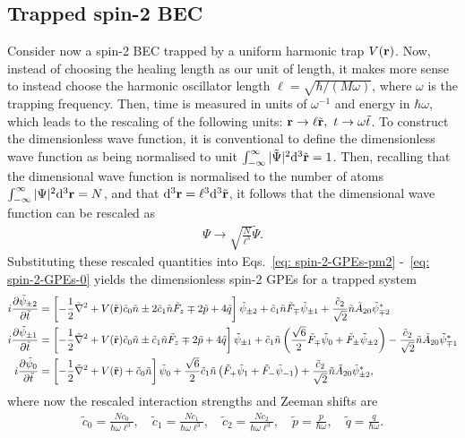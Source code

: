 \subsection{Trapped spin-2 BEC}\label{subsec: spin-2-dimensionless}
Consider now a spin-2 BEC trapped by a uniform harmonic trap \(V(\vb{r})\).
Now, instead of choosing the healing length as our unit of length, it makes more
sense to instead choose the harmonic oscillator length \(\ell =
\sqrt{\hbar/(M\omega)}\), where \(\omega \) is the trapping frequency.
Then, time is measured in units of \(\omega^{-1}\) and energy in
\(\hbar\omega \), which leads to the rescaling of the following units:
\(\vb{r}\rightarrow \ell\tilde{\vb{r}},\ t \rightarrow \omega\tilde{t}\).
To construct the dimensionless wave function, it is conventional to define the
dimensionless wave function as being normalised to unit
\(\int_{-\infty}^\infty |\tilde{\Psi}|^2\dd^3\tilde{\vb{r}} = 1\).
Then, recalling that the dimensional wave function is normalised to the number
of atoms \(\int_{-\infty}^\infty |{\Psi}|^2\dd^3{\vb{r}} = N\), and that
\(\dd^3\vb{r} = \ell^3\dd^3\tilde{\vb{r}}\), it follows that the dimensional
wave function can be rescaled as
\begin{align}
    \Psi \rightarrow \sqrt{\frac{N}{\ell^3}}\tilde{\Psi}.
\end{align}
Substituting these rescaled quantities into Eqs.~\eqref{eq: spin-2-GPEs-pm2}
-~\eqref{eq: spin-2-GPEs-0} yields the dimensionless spin-2 GPEs for a trapped
system
\begin{align}
    i\pdv{\tilde{\psi}_{\pm 2}}{\tilde{t}} &= \left[-\frac{1}{2}\tilde{\nabla}^2
    +V(\tilde{\vb{r}}) \tilde{c}_0\tilde{n} \pm 2\tilde{c}_1\tilde{n}\tilde{F}_z
    \mp 2\tilde{p} + 4\tilde{q}\right]\tilde{\psi}_{\pm 2}
    + \tilde{c}_1\tilde{n}\tilde{F}_\mp\tilde{\psi}_{\pm 1}
    + \frac{\tilde{c}_2}{\sqrt{2}}\tilde{n}\tilde{A}_{20}\tilde{\psi}_{\mp 2}^*
    \\
    i\pdv{\tilde{\psi}_{\pm 1}}{\tilde{t}} &= \left[-\frac{1}{2}\tilde{\nabla}^2
    +V(\tilde{\vb{r}}) \tilde{c}_0\tilde{n} \pm \tilde{c}_1\tilde{n}\tilde{F}_z
    \mp 2\tilde{p} + 4\tilde{q}\right]\tilde{\psi}_{\pm 1}
    +\tilde{c}_1\tilde{n}\left(\frac{\sqrt{6}}{2}\tilde{F}_\mp \tilde{\psi}_0
    +\tilde{F}_\pm\tilde{\psi}_{\pm 2}\right)
    - \frac{\tilde{c}_2}{\sqrt{2}}\tilde{n}\tilde{A}_{20}\tilde{\psi}_{\mp 1}^*
    \\
    i\pdv{\tilde{\psi}_0}{\tilde{t}} &= \left[-\frac{1}{2}\tilde{\nabla}^2
    +V(\tilde{\vb{r}})+\tilde{c}_0\tilde{n}\right]\tilde{\psi}_0
    +\frac{\sqrt{6}}{2}\tilde{c}_1\tilde{n}\left(\tilde{F}_+\tilde{\psi}_1
    +\tilde{F}_-\tilde{\psi}_{-1}\right)
    + \frac{\tilde{c}_2}{\sqrt{2}}\tilde{n}\tilde{A}_{20}\tilde{\psi}_{\pm 2}^*,
\end{align}
where now the rescaled interaction strengths and Zeeman shifts are
\begin{align}\label{eq: spin-2-interaction-strengths-dimensionless}
    \tilde{c}_0 = \frac{Nc_0}{\hbar\omega\ell^3}, \quad
    \tilde{c}_1 = \frac{Nc_1}{\hbar\omega\ell^3}, \quad
    \tilde{c}_2 = \frac{Nc_2}{\hbar\omega\ell^3}, \quad
    \tilde{p} = \frac{p}{\hbar\omega}, \quad
    \tilde{q} = \frac{q}{\hbar\omega}.
\end{align}

